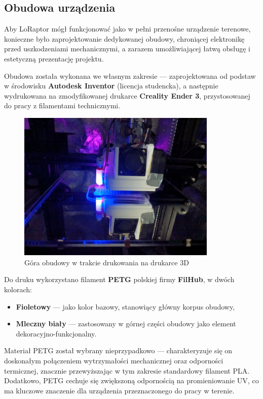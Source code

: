 \subsection{Obudowa urządzenia}

Aby LoRaptor mógł funkcjonować jako w pełni przenośne urządzenie terenowe, konieczne było zaprojektowanie dedykowanej obudowy, chroniącej elektronikę przed uszkodzeniami mechanicznymi, a zarazem umożliwiającej łatwą obsługę i estetyczną prezentację projektu.

Obudowa została wykonana we własnym zakresie — zaprojektowana od podstaw w środowisku \textbf{Autodesk Inventor} (licencja studencka), a następnie wydrukowana na zmodyfikowanej drukarce \textbf{Creality Ender 3}, przystosowanej do pracy z filamentami technicznymi.

\vspace{1cm}
\begin{figure}[htbp]
\centering
	\includegraphics[width=0.85\textwidth]{root/in_printing.jpg}
	\caption{Góra obudowy w trakcie drukowania na drukarce 3D}
\end{figure}

\clearpage
Do druku wykorzystano filament \textbf{PETG} polskiej firmy \textbf{FilHub}, w dwóch kolorach:
\begin{itemize}
	\item \textbf{Fioletowy} — jako kolor bazowy, stanowiący główny korpus obudowy,
	\item \textbf{Mleczny biały} — zastosowany w górnej części obudowy jako element dekoracyjno-funkcjonalny.
\end{itemize}

Materiał PETG został wybrany nieprzypadkowo — charakteryzuje się on doskonałym połączeniem wytrzymałości mechanicznej oraz odporności termicznej, znacznie przewyższając w tym zakresie standardowy filament PLA. Dodatkowo, PETG cechuje się zwiększoną odpornością na promieniowanie UV, co ma kluczowe znaczenie dla urządzenia przeznaczonego do pracy w terenie.

